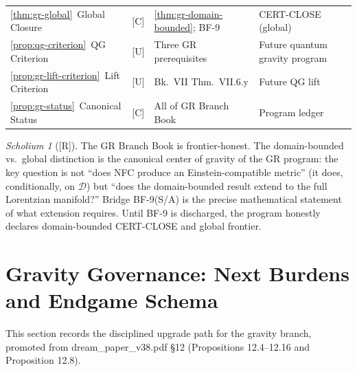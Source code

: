 \documentclass[12pt,oneside]{amsbook}
\theoremstyle{plain}
\theoremstyle{definition}
\theoremstyle{remark}
\newtheorem{scholium}[theorem]{Scholium}
\newcommand{\status}[1]{\textup{[#1]}}
\begin{document}
\begin{tabular}{@{}p{4.0cm}p{0.8cm}p{3.6cm}p{4.2cm}@{}}
\ref{thm:gr-global}\ Global Closure
 & [C] & \ref{thm:gr-domain-bounded}; BF-9
 & CERT-CLOSE (global) \\

\ref{prop:qg-criterion}\ QG Criterion
 & [U] & Three GR prerequisites
 & Future quantum gravity program \\

\ref{prop:gr-lift-criterion}\ Lift Criterion
 & [U] & Bk.~VII Thm.~VII.6.y
 & Future QG lift \\

\ref{prop:gr-status}\ Canonical Status
 & [C] & All of GR Branch Book
 & Program ledger \\
\hline
\end{tabular}
\renewcommand{\arraystretch}{1}

\medskip

\begin{scholium}[\status{R}]
The GR Branch Book is frontier-honest. The domain-bounded vs.\
global distinction is the canonical center of gravity of the GR
program: the key question is not ``does NFC produce an
Einstein-compatible metric'' (it does, conditionally, on
$\mathcal{D}$) but ``does the domain-bounded result extend to the
full Lorentzian manifold?'' Bridge BF-9(S/A) is the precise
mathematical statement of what extension requires. Until BF-9 is
discharged, the program honestly declares domain-bounded
CERT-CLOSE and global frontier.
\end{scholium}


\section{Gravity Governance: Next Burdens and Endgame Schema}
\label{sec:gr-governance}

This section records the disciplined upgrade path for the gravity
branch, promoted from dream\_paper\_v38.pdf \S12 (Propositions
12.4--12.16 and Proposition 12.8).
\end{document}
